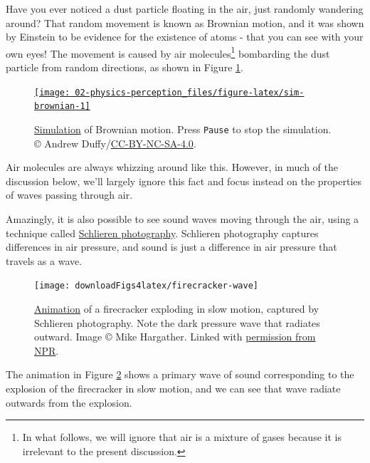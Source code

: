 \documentclass[
]{book}
\begin{document}
Have you ever noticed a dust particle floating in the air, just randomly wandering around?
That random movement is known as Brownian motion, and it was shown by Einstein to be evidence for the existence of atoms - that you can see with your own eyes!
The movement is caused by air molecules\footnote{In what follows, we will ignore that air is a mixture of gases because it is irrelevant to the present discussion.} bombarding the dust particle from random directions, as shown in Figure \ref{fig:sim-brownian}.



\begin{figure}
\href{https://physics.bu.edu/~duffy/HTML5/brownian_motion.html}{\texttt{[image: 02-physics-perception\_files/figure-latex/sim-brownian-1]} }\caption{\href{https://physics.bu.edu/~duffy/HTML5/brownian_motion.html}{Simulation} of Brownian motion. Press \texttt{Pause} to stop the simulation. © Andrew Duffy/\href{https://creativecommons.org/licenses/by-nc-sa/4.0/}{CC-BY-NC-SA-4.0}.}\label{fig:sim-brownian}
\end{figure}

Air molecules are always whizzing around like this.
However, in much of the discussion below, we'll largely ignore this fact and focus instead on the properties of waves passing through air.

Amazingly, it is also possible to see sound waves moving through the air, using a technique called \href{https://en.wikipedia.org/wiki/Schlieren_photography}{Schlieren photography}.
Schlieren photography captures differences in air pressure, and sound is just a difference in air pressure that travels as a wave.



\begin{figure}
\texttt{[image: downloadFigs4latex/firecracker-wave]} \caption{\href{http://media.npr.org/assets/img/2014/01/21/cracker.gif}{Animation} of a firecracker exploding in slow motion, captured by Schlieren photography. Note the dark pressure wave that radiates outward. Image © Mike Hargather. Linked with \href{https://www.npr.org/about-npr/179876898/terms-of-use\#LinksNPRServices}{permission from NPR}.}\label{fig:firecracker-wave}
\end{figure}

The animation in Figure \ref{fig:firecracker-wave} shows a primary wave of sound corresponding to the explosion of the firecracker in slow motion, and we can see that wave radiate outwards from the explosion.
\end{document}
